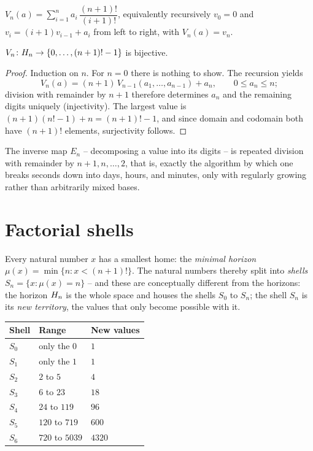 \begin{definition}
$V_n(a)=\sum_{i=1}^{n}a_i\,\dfrac{(n+1)!}{(i+1)!}$, equivalently
recursively $v_0=0$ and $v_i=(i{+}1)v_{i-1}+a_i$ from left to
right, with $V_n(a)=v_n$.
\end{definition}

\begin{satz}[Register S1]
$V_n\colon H_{n}\to\{0,\ldots,(n+1)!-1\}$ is bijective.
\end{satz}

\begin{proof}
Induction on $n$. For $n=0$ there is nothing to show. The recursion
yields
\[
V_n(a)=(n{+}1)\,V_{n-1}(a_1,\ldots,a_{n-1})+a_n,
\qquad 0\le a_n\le n;
\]
division with remainder by $n+1$ therefore determines $a_n$
and the remaining digits uniquely (injectivity). The largest value
is $(n{+}1)(n!-1)+n=(n{+}1)!-1$, and since domain and codomain both
have $(n+1)!$ elements, surjectivity follows.
\end{proof}

The inverse map $E_n$ -- decomposing a value into its digits -- is
repeated division with remainder by $n{+}1, n, \ldots, 2$, that is,
exactly the algorithm by which one breaks seconds down into days,
hours, and minutes, only with regularly growing rather than
arbitrarily mixed bases.

\section{Factorial shells}

Every natural number $x$ has a smallest home: the
\emph{minimal horizon} $\mu(x)=\min\{n:x<(n+1)!\}$. The natural
numbers thereby split into \emph{shells} $S_n=\{x:\mu(x)=n\}$ --
and these are conceptually different from the horizons: the
horizon $H_{n}$ is the whole space and houses the shells
$S_0$ to $S_n$; the shell $S_n$ is its \emph{new territory}, the
values that only become possible with it.

\begin{center}
\begin{tabular}{lll}
Shell & Range & New values\\
\hline
$S_0$ & only the $0$ & $1$\\
$S_1$ & only the $1$ & $1$\\
$S_2$ & $2$ to $5$ & $4$\\
$S_3$ & $6$ to $23$ & $18$\\
$S_4$ & $24$ to $119$ & $96$\\
$S_5$ & $120$ to $719$ & $600$\\
$S_6$ & $720$ to $5039$ & $4320$\\
\end{tabular}
\end{center}

